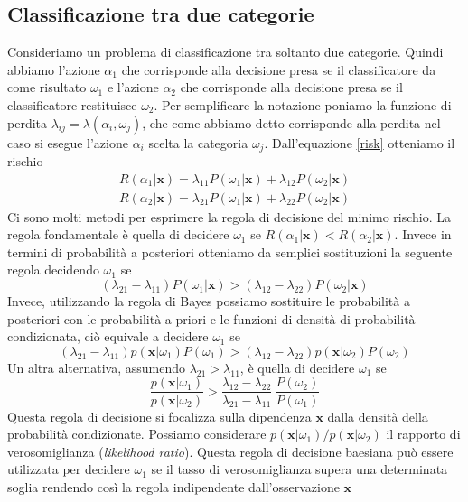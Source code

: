 \subsection{Classificazione tra due categorie}
Consideriamo un problema di classificazione tra soltanto due categorie. Quindi abbiamo l'azione $\alpha_1$ che corrisponde alla decisione presa se il classificatore da come risultato $\omega_1$ e l'azione $\alpha_2$ che corrisponde alla decisione presa se il classificatore restituisce $\omega_2$. Per semplificare la notazione poniamo la funzione di perdita $\lambda_{ij} = \lambda(\alpha_i, \omega_j)$, che come abbiamo detto corrisponde alla perdita nel caso si esegue l'azione $\alpha_i$ scelta la categoria $\omega_j$. Dall'equazione \ref{risk} otteniamo il rischio
\begin{gather}
R(\alpha_1 | \mathbf{x}) =  \lambda_{11} P(\omega_1 | \mathbf{x}) + \lambda_{12} P(\omega_2 | \mathbf{x})\\
R(\alpha_2 | \mathbf{x}) =  \lambda_{21} P(\omega_1 | \mathbf{x}) + \lambda_{22} P(\omega_2 | \mathbf{x})
\end{gather}
Ci sono molti metodi per esprimere la regola di decisione del minimo rischio. La regola fondamentale è quella di decidere $\omega_1$ se $R(\alpha_1 | \mathbf{x}) < R(\alpha_2 | \mathbf{x})$. Invece in termini di probabilità a posteriori otteniamo da semplici sostituzioni la seguente regola decidendo $\omega_1$ se
\begin{equation}
(\lambda_{21} - \lambda_{11}) P(\omega_1 | \mathbf{x}) > (\lambda_{12} - \lambda_{22}) P(\omega_2 | \mathbf{x})
\end{equation}
 Invece, utilizzando la regola di Bayes possiamo sostituire le probabilità a posteriori con le probabilità a priori e le funzioni di densità di probabilità condizionata, ciò equivale a decidere $\omega_1$ se
\begin{equation}
(\lambda_{21} - \lambda_{11}) p(\mathbf{x}|\omega_1) P(\omega_1) > (\lambda_{12} - \lambda_{22}) p(\mathbf{x}|\omega_2) P(\omega_2)
\end{equation}
Un altra alternativa, assumendo $\lambda_{21} > \lambda_{11}$, è quella di decidere $\omega_1$ se
\begin{equation}
\frac{p(\mathbf{x}|\omega_1)}{p(\mathbf{x}|\omega_2)} > \frac{\lambda_{12} - \lambda_{22}}{\lambda_{21} - \lambda_{11}} \ \frac{P(\omega_2)}{P(\omega_1)}
\end{equation}
Questa regola di decisione si focalizza sulla dipendenza $\mathbf{x}$ dalla densità della probabilità condizionate. Possiamo considerare $p(\mathbf{x}|\omega_1) / p(\mathbf{x}|\omega_2)$ il rapporto di verosomiglianza (\emph{likelihood ratio}). Questa regola di decisione baesiana può essere utilizzata per decidere $\omega_1$ se il tasso di verosomiglianza supera una determinata soglia rendendo così la regola indipendente dall'osservazione $\mathbf{x}$

